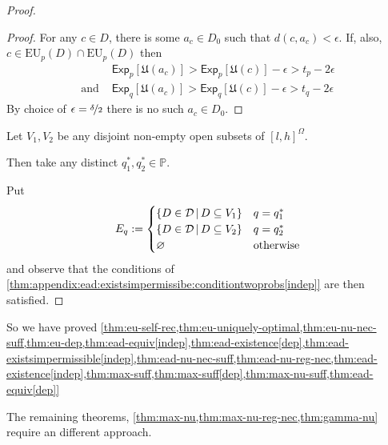 \documentclass[a4paper]{article}
\newcommand\A{\mathcal{A}}
\renewcommand\P{\mathbb{P}} %
\newcommand\Exp{\mathsf{Exp}}
\newcommand\EU{\mathrm{EU}}
\newcommand\U{\mathfrak{U}} %
\newcommand{\Decs}{\mathcal{D}}
\newcommand{\IP}{\P}
\renewcommand{\color}[1]{}
\newenvironment{colored}[1]{\leavevmode\color{#1}}{}
\newcommand\SetDelimiter[1][]{
	\nonscript\,#1\vert \allowbreak \nonscript\,\mathopen{}}
\providecommand\given{\SetDelimiter}
\renewcommand{\emptyset}{\varnothing}
\renewcommand{\leq}{\leqslant}
\newenvironment{CCM rewritten}
{\begingroup\color{blue}} %
{\endgroup}              %
\begin{document}
\begin{colored}{violet}
\begin{proof}
\begin{proof}
		For any $c\in D$, there is some $a_c\in D_0$ such that $d(c,a_c)<\epsilon$. If, also,  $c\in \EU_{p}(D)\cap\EU_{p}(D)$ then 
		\begin{align}
			&\Exp_{p}[\U(a_c)]>\Exp_{p}[\U(c)]-\epsilon>t_p-2\epsilon\\
			\text{and }&\Exp_{q}[\U(a_c)]>\Exp_{q}[\U(c)]-\epsilon>t_q-2\epsilon
		\end{align}
		By choice of $\epsilon=\nicefrac{\delta}{2}$ there is no such $a_c\in D_0$. 
	\end{proof}
	
	Let $V_1,V_2$ be any disjoint non-empty open subsets of $[l,h]^\Omega$. 
	
	Then take any distinct $q^*_1,q^*_2\in\IP$. 
	
	Put $$E_q:=\begin{cases}
		\{D\in\Decs\given D\subseteq V_1\}&q=q^*_1\\
			\{D\in\Decs\given D\subseteq V_2\}&q=q^*_2\\
		\emptyset&\text{otherwise}
	\end{cases}$$
	and observe that the conditions of \cref{thm:appendix:ead:existsimpermissibe:conditiontwoprobs[indep]} are then satisfied. 
\end{proof}




So we have proved \cref{thm:eu-self-rec,thm:eu-uniquely-optimal,thm:eu-nu-nec-suff,thm:eu-dep,thm:ead-equiv[indep],thm:ead-existence[dep],thm:ead-existsimpermissible[indep],thm:ead-nu-nec-suff,thm:ead-nu-reg-nec,thm:ead-existence[indep],thm:max-suff,thm:max-suff[dep],thm:max-nu-suff,thm:ead-equiv[dep]}

The remaining theorems, \cref{thm:max-nu,thm:max-nu-reg-nec,thm:gamma-nu} require an different approach.

\end{colored}
\end{document}
